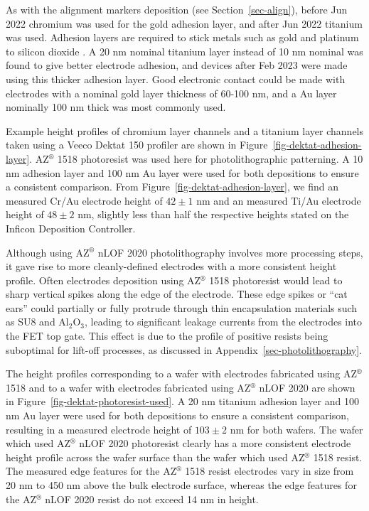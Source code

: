 \documentclass[
  a4paper,
]{scrbook}
\begin{document}
As with the alignment markers deposition (see Section~\ref{sec-align}),
before Jun 2022 chromium was used for the gold adhesion layer, and after
Jun 2022 titanium was used. Adhesion layers are required to stick metals
such as gold and platinum to silicon dioxide \autocite{Guarnieri2014}. A
20 nm nominal titanium layer instead of 10 nm nominal was found to give
better electrode adhesion, and devices after Feb 2023 were made using
this thicker adhesion layer. Good electronic contact could be made with
electrodes with a nominal gold layer thickness of 60-100 nm, and a Au
layer nominally 100 nm thick was most commonly used.

Example height profiles of chromium layer channels and a titanium layer
channels taken using a Veeco Dektat 150 profiler are shown in
Figure~\ref{fig-dektat-adhesion-layer}. AZ\(^\circledR\) 1518
photoresist was used here for photolithographic patterning. A 10 nm
adhesion layer and 100 nm Au layer were used for both depositions to
ensure a consistent comparison. From
Figure~\ref{fig-dektat-adhesion-layer}, we find an measured Cr/Au
electrode height of \(42\pm1\) nm and an measured Ti/Au electrode height
of \(48\pm2\) nm, slightly less than half the respective heights stated
on the Inficon Deposition Controller.

Although using AZ\(^\circledR\) nLOF 2020 photolithography involves more
processing steps, it gave rise to more cleanly-defined electrodes with a
more consistent height profile. Often electrodes deposition using
AZ\(^\circledR\) 1518 photoresist would lead to sharp vertical spikes
along the edge of the electrode. These edge spikes or ``cat ears'' could
partially or fully protrude through thin encapsulation materials such as
SU8 and Al\(_2\)O\(_3\), leading to significant leakage currents from
the electrodes into the FET top gate. This effect is due to the profile
of positive resists being suboptimal for lift-off processes, as
discussed in Appendix~\ref{sec-photolithography}.

The height profiles corresponding to a wafer with electrodes fabricated
using AZ\(^\circledR\) 1518 and to a wafer with electrodes fabricated
using AZ\(^\circledR\) nLOF 2020 are shown in
Figure~\ref{fig-dektat-photoresist-used}. A 20 nm titanium adhesion
layer and 100 nm Au layer were used for both depositions to ensure a
consistent comparison, resulting in a measured electrode height of
\(103\pm2\) nm for both wafers. The wafer which used AZ\(^\circledR\)
nLOF 2020 photoresist clearly has a more consistent electrode height
profile across the wafer surface than the wafer which used
AZ\(^\circledR\) 1518 resist. The measured edge features for the
AZ\(^\circledR\) 1518 resist electrodes vary in size from 20 nm to 450
nm above the bulk electrode surface, whereas the edge features for the
AZ\(^\circledR\) nLOF 2020 resist do not exceed 14 nm in height.
\end{document}
